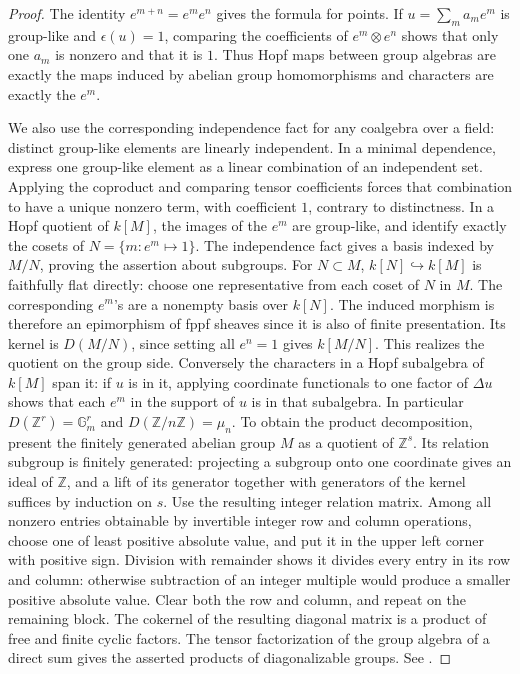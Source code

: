 \documentclass[11pt,a4paper,openany,oneside]{book}
\theoremstyle{resultstyle}
\theoremstyle{definition}
\numberwithin{equation}{chapter}
\begin{document}
\begin{proof}
The identity \(e^{m+n}=e^me^n\) gives the formula for points.
If \(u=\sum_m a_me^m\) is group-like and \(\epsilon(u)=1\), comparing
the coefficients of \(e^m\otimes e^n\) shows that only one \(a_m\)
is nonzero and that it is \(1\). Thus Hopf maps between group
algebras are exactly the maps induced by abelian group homomorphisms
and characters are exactly the \(e^m\).

We also use the corresponding independence fact for any coalgebra
over a field: distinct group-like elements are linearly independent.
In a minimal dependence, express one group-like element as a
linear combination of an independent set. Applying the coproduct
and comparing tensor coefficients forces that combination to have
a unique nonzero term, with coefficient \(1\), contrary to
distinctness. In a Hopf quotient of \(k[M]\), the images of the
\(e^m\) are group-like, and identify exactly the cosets of
\(N=\{m:e^m\mapsto1\}\). The independence fact gives a basis indexed
by \(M/N\), proving the assertion about subgroups. For \(N\subset M\),
\(k[N]\hookrightarrow k[M]\) is faithfully flat directly:
choose one representative from each coset of \(N\) in \(M\).
The corresponding \(e^m\)'s are a nonempty basis over \(k[N]\).
The induced morphism is therefore an epimorphism of fppf sheaves
since it is also of finite presentation. Its kernel is \(D(M/N)\),
since setting all \(e^n=1\) gives \(k[M/N]\).
This realizes the quotient on the group side.
Conversely the characters in a
Hopf subalgebra of \(k[M]\) span it: if \(u\) is in it, applying
coordinate functionals to one factor of \(\Delta u\) shows that
each \(e^m\) in the support of \(u\) is in that subalgebra.
In particular \(D(\mathbb Z^r)=\mathbb G_m^r\) and
\(D(\mathbb Z/n\mathbb Z)=\mu_n\). To obtain the product decomposition,
present the finitely generated abelian group \(M\) as a quotient of
\(\mathbb Z^s\).
Its relation subgroup is finitely generated: projecting a subgroup onto
one coordinate gives an ideal of \(\mathbb Z\), and a lift of its generator
together with generators of the kernel suffices by induction on \(s\).
Use the resulting integer relation matrix. Among all nonzero entries
obtainable by invertible integer row and column operations, choose one
of least positive absolute value, and put it in the upper left corner
with positive sign. Division with remainder shows it divides every
entry in its row and column: otherwise subtraction of an integer
multiple would produce a smaller positive absolute value. Clear both
the row and column, and repeat on the remaining block. The cokernel of
the resulting diagonal matrix is a product of free and finite cyclic
factors. The tensor factorization of the group algebra of a direct
sum gives the asserted products of diagonalizable groups.
See \cite[Proposition 12.3, Lemma 12.4 and
Theorems 12.8--12.9]{milne}.
\end{proof}
\end{document}
